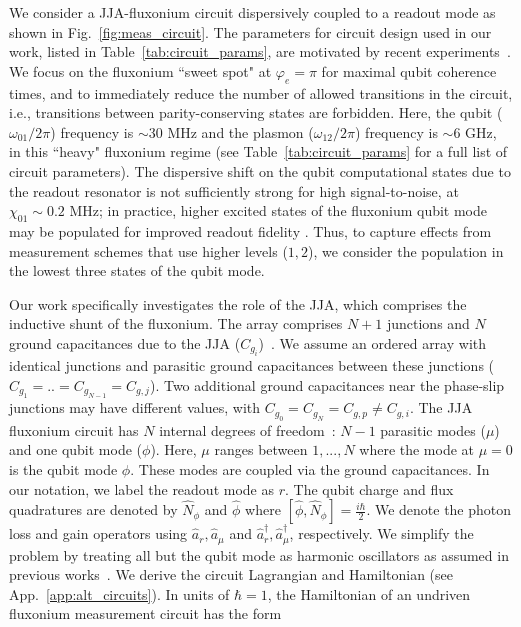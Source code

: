 \documentclass[prx,showpacs,notitlepage,twocolumn,superscriptaddress,nofootinbib,preprintnumbers,floatfix]{revtex4-2}
\begin{document}
We consider a JJA-fluxonium circuit dispersively coupled to a readout mode as shown in Fig.~\ref{fig:meas_circuit}. The parameters for circuit design used in our work, listed in Table~\ref{tab:circuit_params}, are motivated by recent experiments~\cite{zhang_tunable_2024,zhang_universal_2021}. We focus on the fluxonium ``sweet spot" at $\varphi_e = \pi$ for maximal qubit coherence times, and to immediately reduce the number of allowed transitions in the circuit, i.e., transitions between parity-conserving states are forbidden. Here, the qubit ($\omega_{01}/2\pi$) frequency is $\sim 30$ MHz and the plasmon ($\omega_{12}/2\pi$) frequency is $\sim 6$ GHz, in this ``heavy" fluxonium regime (see Table~\ref{tab:circuit_params} for a full list of circuit parameters). The dispersive shift on the qubit computational states due to the readout resonator is not sufficiently strong for high signal-to-noise, at $\chi_{01} \sim 0.2$ MHz; in practice, higher excited states of the fluxonium qubit mode may be populated for improved readout fidelity \cite{zhang_universal_2021}. Thus, to capture effects from measurement schemes that use higher levels ($1,2$), we consider the population in the lowest three states of the qubit mode. 

Our work specifically investigates the role of the JJA, which comprises the inductive shunt of the fluxonium. The array comprises $N+1$ junctions and $N$ ground capacitances due to the JJA ($C_{g_i}$)~\cite{manucharyan2009fluxonium}. We assume an ordered array with identical junctions and parasitic ground capacitances between these junctions ($C_{g_1}=..=C_{g_{N-1}}=C_{g,j}$). Two additional ground capacitances near the phase-slip junctions may have different values, with $C_{g_0}=C_{g_N}=C_{g,p}\neq C_{g, i}$. The JJA fluxonium circuit has $N$ internal degrees of freedom~\cite{ferguson2013symmetries,viola2015collective}: $N-1$ parasitic modes ($\mu$) and one qubit mode ($\phi$). Here, $\mu$ ranges between $1,...,N$ where the mode at $\mu = 0$ is the qubit mode $\phi$. These  modes are coupled via the ground capacitances. 
In our notation, we label the readout mode as $r$. The qubit charge and flux quadratures are denoted by $\hat N_\phi$ and $\hat \phi$ where $[\hat \phi,\hat N_\phi]=\frac{i\hbar}{2}$. We denote the photon loss and gain operators using $\hat a_r,\hat a_\mu$ and $\hat a_r^\dagger,\hat a_\mu^\dagger$, respectively. We simplify the problem by treating all but the qubit mode as harmonic oscillators as assumed in previous works~\cite{ferguson2013symmetries,viola2015collective,dumas2024unified}. We derive the circuit Lagrangian and Hamiltonian (see App.~\ref{app:alt_circuits}). In units of $\hbar=1$, the Hamiltonian of an undriven fluxonium measurement circuit has the form 
\end{document}
